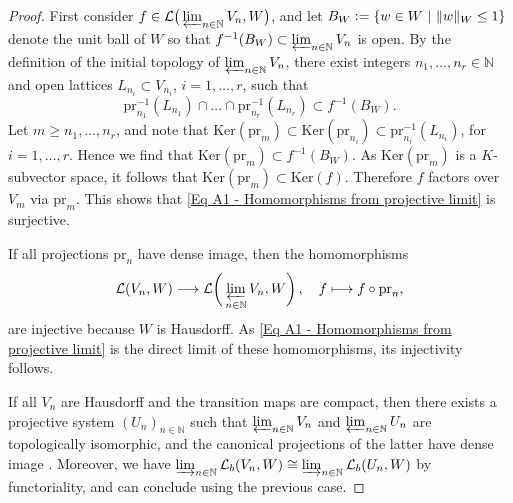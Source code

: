 \documentclass[a4paper, reqno, 10pt]{amsart}
\theoremstyle{definition}
\numberwithin{equation}{section}
\newcommand{\abs}[1]{{\lvert{#1}\rvert}}
\newcommand{\defeq}{\vcentcolon=}
\newcommand{\Ker}{{\mathrm{Ker}}}
\newcommand{\lra}{\longrightarrow}
\newcommand{\lto}{\longmapsto}
\newcommand{\pr}{{\mathrm{pr}}}
\newcommand{\ra}{\rightarrow}
\let\originalmiddle\middle
\renewcommand{\middle}[1]{\,\originalmiddle#1\,}
\newcommand{\BN}{{\mathbb {N}}}
\newcommand{\CL}{{\mathcal {L}}}
\begin{document}
\begin{proof}	
First consider $f \in \CL \big( \varprojlim_{n\in \BN} V_n, W \big)$, and let $B_W \defeq \left\{ w\in W \middle{|} \lVert w \rVert_W \leq 1 \right\}$ denote the unit ball of $W$ so that $f^{-1}(B_W) \subset \varprojlim_{n\in \BN} V_n$ is open.
By the definition of the initial topology of $\varprojlim_{n\in \BN} V_n$, there exist integers $n_1,\ldots,n_r \in \BN$ and open lattices $L_{n_i}\subset V_{n_i}$, $i=1,\ldots,r$, such that
\begin{equation*}
	\pr_{n_1}^{-1}(L_{n_1}) \cap \ldots \cap \pr_{n_r}^{-1}(L_{n_r}) \subset f^{-1}(B_W).
\end{equation*}
Let $m\geq n_1,\ldots,n_r$, and note that $\Ker(\pr_m) \subset \Ker(\pr_{n_i})\subset \pr_{n_i}^{-1}(L_{n_i})$, for $i=1,\ldots,r$.
Hence we find that $\Ker(\pr_m) \subset f^{-1}(B_W)$.
As $\Ker(\pr_m)$ is a $K$-subvector space, it follows that $\Ker(\pr_m) \subset \Ker(f)$.
Therefore $f$ factors over $V_m$ via $\pr_m$.
This shows that \eqref{Eq A1 - Homomorphisms from projective limit} is surjective.


If all projections $\pr_n$ have dense image, then the homomorphisms
\begin{equation*}
	\CL (V_n, W) \lra \CL\bigg(\varprojlim_{n\in \BN} V_n, W\bigg) \,,\quad f \lto f \circ \pr_n ,
\end{equation*}
are injective because $W$ is Hausdorff.
As \eqref{Eq A1 - Homomorphisms from projective limit} is the direct limit of these homomorphisms, its injectivity follows.


If all $V_n$ are Hausdorff and the transition maps are compact, then there exists a projective system $(U_n)_{n\in\BN}$ such that $\varprojlim_{n\in \BN} V_n$ and $\varprojlim_{n\in \BN} U_n$ are topologically isomorphic, and the canonical projections of the latter have dense image \cite[p.\ 93]{Schneider02NonArchFunctAna}.
Moreover, we have $\varinjlim_{n\in \BN} \CL_b(V_n,W) \cong \varinjlim_{n \in \BN} \CL_b(U_n,W)$ by functoriality, and can conclude using the previous case.
\end{proof}
\end{document}

